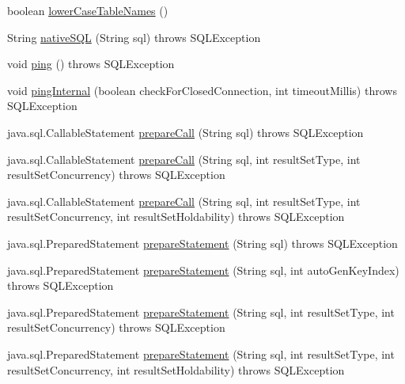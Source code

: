\begin{DoxyCompactItemize}
\item 
boolean \mbox{\hyperlink{classcom_1_1mysql_1_1cj_1_1jdbc_1_1_connection_impl_a75475406eba7048aeb899c27d04f2c59}{lower\+Case\+Table\+Names}} ()
\item 
String \mbox{\hyperlink{classcom_1_1mysql_1_1cj_1_1jdbc_1_1_connection_impl_a6c1d69bc49b04ac714fbe2e79062f2c1}{native\+S\+QL}} (String sql)  throws S\+Q\+L\+Exception 
\item 
void \mbox{\hyperlink{classcom_1_1mysql_1_1cj_1_1jdbc_1_1_connection_impl_a790847769075cca4f1f42d47b864f3e3}{ping}} ()  throws S\+Q\+L\+Exception 
\item 
void \mbox{\hyperlink{classcom_1_1mysql_1_1cj_1_1jdbc_1_1_connection_impl_a7da1e11bed26e0346d29c166fc99b133}{ping\+Internal}} (boolean check\+For\+Closed\+Connection, int timeout\+Millis)  throws S\+Q\+L\+Exception 
\item 
java.\+sql.\+Callable\+Statement \mbox{\hyperlink{classcom_1_1mysql_1_1cj_1_1jdbc_1_1_connection_impl_aa4436c4ed7f7b2c5ea3f12b62486e844}{prepare\+Call}} (String sql)  throws S\+Q\+L\+Exception 
\item 
java.\+sql.\+Callable\+Statement \mbox{\hyperlink{classcom_1_1mysql_1_1cj_1_1jdbc_1_1_connection_impl_a92f3c0f9e16a6a2a59ab6faff6838154}{prepare\+Call}} (String sql, int result\+Set\+Type, int result\+Set\+Concurrency)  throws S\+Q\+L\+Exception 
\item 
java.\+sql.\+Callable\+Statement \mbox{\hyperlink{classcom_1_1mysql_1_1cj_1_1jdbc_1_1_connection_impl_a40c8901e99390a31378f4ad4f09cbdf4}{prepare\+Call}} (String sql, int result\+Set\+Type, int result\+Set\+Concurrency, int result\+Set\+Holdability)  throws S\+Q\+L\+Exception 
\item 
java.\+sql.\+Prepared\+Statement \mbox{\hyperlink{classcom_1_1mysql_1_1cj_1_1jdbc_1_1_connection_impl_ad3f606e709c6f97bb42701340ff0d44d}{prepare\+Statement}} (String sql)  throws S\+Q\+L\+Exception 
\item 
java.\+sql.\+Prepared\+Statement \mbox{\hyperlink{classcom_1_1mysql_1_1cj_1_1jdbc_1_1_connection_impl_a6ad097415e0e105b2d7629cc4d6e24a5}{prepare\+Statement}} (String sql, int auto\+Gen\+Key\+Index)  throws S\+Q\+L\+Exception 
\item 
java.\+sql.\+Prepared\+Statement \mbox{\hyperlink{classcom_1_1mysql_1_1cj_1_1jdbc_1_1_connection_impl_a9673b3a241062ca773bdc76af945f62e}{prepare\+Statement}} (String sql, int result\+Set\+Type, int result\+Set\+Concurrency)  throws S\+Q\+L\+Exception 
\item 
java.\+sql.\+Prepared\+Statement \mbox{\hyperlink{classcom_1_1mysql_1_1cj_1_1jdbc_1_1_connection_impl_a15678f2d8c486faa6825b6e7f5bee3fd}{prepare\+Statement}} (String sql, int result\+Set\+Type, int result\+Set\+Concurrency, int result\+Set\+Holdability)  throws S\+Q\+L\+Exception 

\end{DoxyCompactItemize}
